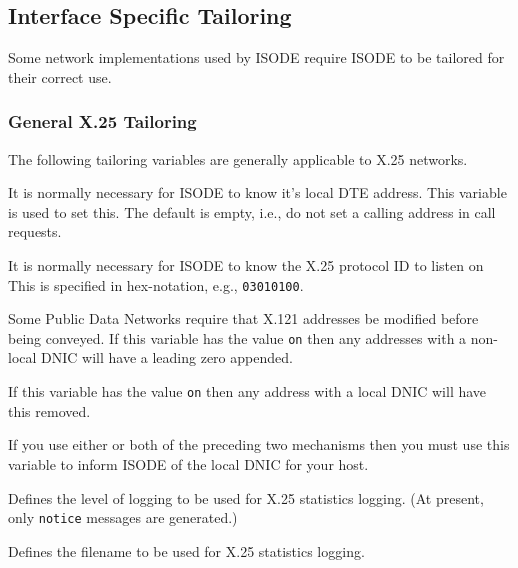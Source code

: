 \subsection{Interface Specific Tailoring}
Some network implementations used by ISODE require ISODE to be
tailored for their correct use.

\subsubsection{General X.25 Tailoring}
The following tailoring variables are generally applicable to
X.25 networks.
\begin{describe}
\item[\verb"x25\_local\_dte"] It is normally
necessary for ISODE to know it's local DTE
address.
This variable is used to set this.
The default is empty, i.e., do not set a calling address in call
requests.

\item[\verb"x25\_local\_pid"] It is normally
necessary for ISODE to know the X.25 protocol ID to listen on
This is specified in hex-notation,
e.g., \verb"03010100".

\item[\verb"x25\_intl\_zero"] Some Public Data Networks
require that X.121 addresses be
modified before being conveyed.
If this variable has the value \verb"on" then any addresses
with a non-local DNIC will have a leading zero appended.

\item[\verb"x25\_strip\_dnic"] If this variable has
the value \verb"on" then any address with
a local DNIC will have this removed.

\item[\verb"x25\_dnic\_prefix"] If you use either or both of the
preceding two mechanisms then you must use this variable to
inform ISODE of the local DNIC for your host.

\item[\verb"x25level":]
Defines the level of logging to be used for X.25 statistics logging.
(At present, only \verb"notice" messages are generated.)

\item[\verb"x25file":]
Defines the filename to be used for X.25 statistics logging.
\end{describe}

